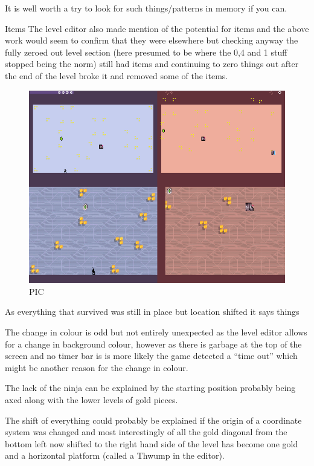 \documentclass[
]{book}
\begin{document}
It is well worth a try to look for such things/patterns in memory if you can.

Items The level editor also made mention of the potential for items and the above work would seem to confirm that they were elsewhere but checking anyway the fully zeroed out level section (here presumed to be where the 0,4 and 1 stuff stopped being the norm) still had items and continuing to zero things out after the end of the level broke it and removed some of the items.

\begin{figure}
\centering
\includegraphics{images/176_home_fast6191_romhackingguide_unrenamed_fil___ers_romhackingguideleveleditingworkedNplus9.png}
\caption{PIC}
\end{figure}

As everything that survived was still in place but location shifted it says things

The change in colour is odd but not entirely unexpected as the level editor allows for a change in background colour, however as there is garbage at the top of the screen and no timer bar is is more likely the game detected a ``time out'' which might be another reason for the change in colour.

The lack of the ninja can be explained by the starting position probably being axed along with the lower levels of gold pieces.

The shift of everything could probably be explained if the origin of a coordinate system was changed and most interestingly of all the gold diagonal from the bottom left now shifted to the right hand side of the level has become one gold and a horizontal platform (called a Thwump in the editor).
\end{document}

